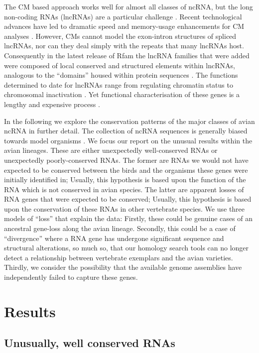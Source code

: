 \documentclass[10pt]{bmc_article}
\newenvironment{bmcformat}{\begin{raggedright}\baselineskip20pt\sloppy\setboolean{publ}{false}}{\end{raggedright}\baselineskip20pt\sloppy}
\begin{document}
\begin{bmcformat}
The CM based approach works well for almost all classes of ncRNA, but
the long non-coding RNAs (lncRNAs) are a particular challenge
\cite{Guttman:2009}. Recent technological advances have led to dramatic
speed and memory-usage enhancements for CM analyses
\cite{Eddy:2002,Nawrocki:2007,Nawrocki:2009,Eddy:2011}. However, CMs
cannot model the exon-intron structures of spliced lncRNAs, nor can they
deal simply with the repeats that many lncRNAs host. Consequently in
the latest release of Rfam the lncRNA families that were added were
composed of local conserved and structured elements within lncRNAs,
analogous to the ``domains'' housed within protein sequences
\cite{Burge:2013}. The functions determined to date for lncRNAs
range from regulating chromatin status to chromosomal inactivation
\cite{Rinn:2007,Chow:2005}. Yet functional characterisation of these
genes is a lengthy and expensive process \cite{Guttman:2009}.

In the following we explore the conservation patterns of the major
classes of avian ncRNA in further detail. The collection of ncRNA
sequences is generally biased towards model organisms
\cite{Gardner:2010,Hoeppner:2012}. We focus our report on the unusual
results within the avian lineages. These are either unexpectedly
well-conserved RNAs or unexpectedly poorly-conserved RNAs. The former
are RNAs we would not have expected to be conserved between the birds
and the organisms these genes were initially identified in; Usually,
this hypothesis is based upon the function of the RNA which is not
conserved in avian species. The latter are apparent losses of RNA
genes that were expected to be conserved; Usually, this hypothesis is
based upon the conservation of these RNAs in other vertebrate species.
We use three models of ``loss'' that explain the data: Firstly, these
could be genuine cases of an ancestral gene-loss along the avian
lineage. Secondly, this could be a case of ``divergence'' where a RNA
gene has undergone significant sequence and structural alterations, so
much so, that our homology search tools can no longer detect a
relationship between vertebrate exemplars and the avian
varieties. Thirdly, we consider the possibility that the available
genome assemblies have independently failed to capture these genes.

\section*{Results}


\subsection*{Unusually, well conserved RNAs}


\end{bmcformat}
\end{document}
